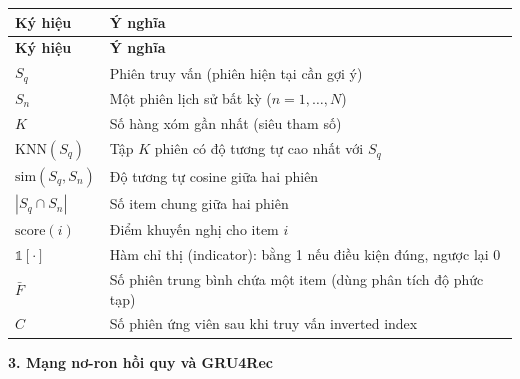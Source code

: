 \documentclass[12pt, a4paper]{article}
\begin{document}
\begin{longtable}{@{}p{4.2cm} p{11cm}@{}}
\toprule
\textbf{Ký hiệu} & \textbf{Ý nghĩa} \\
\midrule
\endfirsthead
\toprule
\textbf{Ký hiệu} & \textbf{Ý nghĩa} \\
\midrule
\endhead
\bottomrule
\endfoot

$S_q$                          & Phiên truy vấn (phiên hiện tại cần gợi ý) \\
$S_n$                          & Một phiên lịch sử bất kỳ ($n = 1, \ldots, N$) \\
$K$                            & Số hàng xóm gần nhất (siêu tham số) \\
$\text{KNN}(S_q)$              & Tập $K$ phiên có độ tương tự cao nhất với $S_q$ \\
$\text{sim}(S_q, S_n)$         & Độ tương tự cosine giữa hai phiên \\
$|S_q \cap S_n|$               & Số item chung giữa hai phiên \\
$\text{score}(i)$              & Điểm khuyến nghị cho item $i$ \\
$\mathbb{1}[\cdot]$            & Hàm chỉ thị (indicator): bằng 1 nếu điều kiện đúng, ngược lại 0 \\
$\bar{F}$                      & Số phiên trung bình chứa một item (dùng phân tích độ phức tạp) \\
$C$                            & Số phiên ứng viên sau khi truy vấn inverted index \\

\end{longtable}

\textbf{3. Mạng nơ-ron hồi quy và GRU4Rec}
\end{document}
